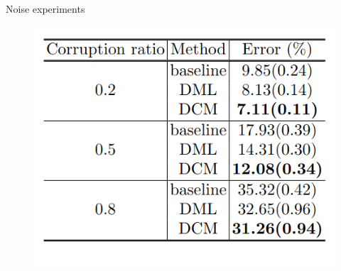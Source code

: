 \documentclass{beamer}
\begin{document}
\begin{frame}{Noise experiments}
    \begin{figure}[h]
        \includegraphics[scale=0.4]{images/table7.png}
    \end{figure}
\end{frame}
\end{document}

